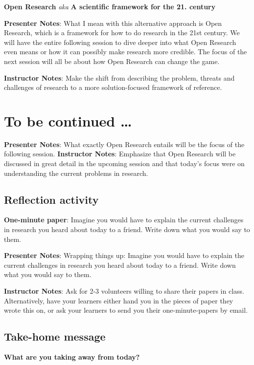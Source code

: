 \documentclass[
  letterpaper,
  DIV=11,
  numbers=noendperiod]{scrartcl}
\begin{document}
\textbf{Open Research} \emph{aka} \textbf{A scientific framework for the
21. century}

\textbf{Presenter Notes}: What I mean with this alternative approach is
Open Research, which is a framework for how to do research in the 21st
century. We will have the entire following session to dive deeper into
what Open Research even means or how it can possibly make research more
credible. The focus of the next session will all be about how Open
Research can change the game.

\textbf{Instructor Notes}: Make the shift from describing the problem,
threats and challenges of research to a more solution-focused framework
of reference.

\section{To be continued \ldots{}}\label{to-be-continued}

\textbf{Presenter Notes}: What exactly Open Research entails will be the
focus of the following session. \textbf{Instructor Notes}: Emphasize
that Open Research will be discussed in great detail in the upcoming
session and that today's focus were on understanding the current
problems in research.

\subsection{Reflection activity}\label{reflection-activity}

\textbf{One-minute paper}: Imagine you would have to explain the current
challenges in research you heard about today to a friend. Write down
what you would say to them.

\textbf{Presenter Notes}: Wrapping things up: Imagine you would have to
explain the current challenges in research you heard about today to a
friend. Write down what you would say to them.

\textbf{Instructor Notes}: Ask for 2-3 volunteers willing to share their
papers in class. Alternatively, have your learners either hand you in
the pieces of paper they wrote this on, or ask your learners to send you
their one-minute-papers by email.

\subsection{Take-home message}\label{take-home-message}

\textbf{What are you taking away from today?}
\end{document}

